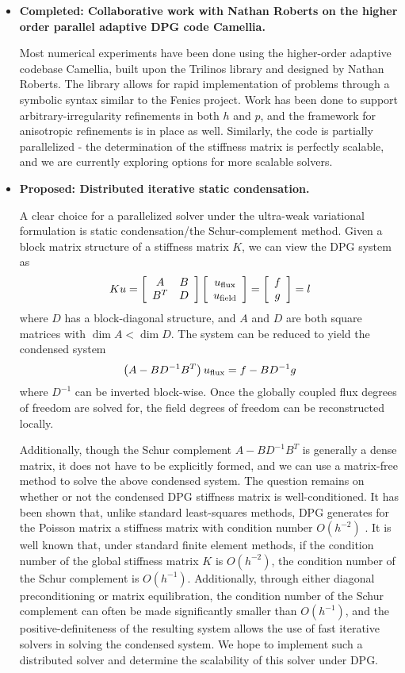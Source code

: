 \begin{itemize}
\item{\textbf{Completed: Collaborative work with Nathan Roberts on the higher order parallel adaptive DPG code Camellia.}}

Most numerical experiments have been done using the higher-order adaptive codebase Camellia, built upon the Trilinos library and designed by Nathan Roberts. The library allows for rapid implementation of problems through a symbolic syntax similar to the Fenics project. Work has been done to support arbitrary-irregularity refinements in both $h$ and $p$, and the framework for anisotropic refinements is in place as well. Similarly, the code is partially parallelized - the determination of the stiffness matrix is perfectly scalable, and we are currently exploring options for more scalable solvers. 

\item{\textbf{Proposed: Distributed iterative static condensation.}}

A clear choice for a parallelized solver under the ultra-weak variational formulation is static condensation/the Schur-complement method. Given a block matrix structure of a stiffness matrix $K$, we can view the DPG system as
\[
Ku = \arr{A}{B}{B^T}{D}\vecttwo{u_{\rm flux}}{u_{\rm field}} = \vecttwo{f}{g} = l
\]
where $D$ has a block-diagonal structure, and $A$ and $D$ are both square matrices with $\dim{A} < \dim{D}$. The system can be reduced to yield the condensed system
\[
\left(A-B D^{-1} B^T\right)u_{\rm flux} = f - B D^{-1} g
\]
where $D^{-1}$ can be inverted block-wise. Once the globally coupled flux degrees of freedom are solved for, the field degrees of freedom can be reconstructed locally. 

Additionally, though the Schur complement $A-B D^{-1} B^T$ is generally a dense matrix, it does not have to be explicitly formed, and we can use a matrix-free method to solve the above condensed system. The question remains on whether or not the condensed DPG stiffness matrix is well-conditioned. It has been shown that, unlike standard least-squares methods, DPG generates for the Poisson matrix a stiffness matrix with condition number $O(h^{-2})$ \cite{practicalDPG}. It is well known that, under standard finite element methods, if the condition number of the global stiffness matrix $K$ is $O(h^{-2})$, the condition number of the Schur complement is $O(h^{-1})$. Additionally, through either diagonal preconditioning or matrix equilibration, the condition number of the Schur complement can often be made significantly smaller than $O(h^{-1})$, and the positive-definiteness of the resulting system allows the use of fast iterative solvers in solving the condensed system. We hope to implement such a distributed solver and determine the scalability of this solver under DPG.
  

\end{itemize}
